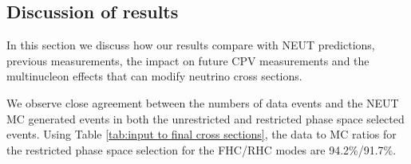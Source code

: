 


 
\subsection{Discussion of results}

In this section we discuss how our results compare with NEUT predictions, previous measurements,
the impact on future CPV measurements and the multinucleon effects that can modify neutrino
cross sections.

We observe close agreement between the numbers of data events
and the NEUT MC generated events in both the unrestricted and restricted
phase space selected events. Using Table \ref{tab:input to final cross sections},
the data to MC ratios for the restricted phase space selection
for the FHC/RHC modes are 94.2\%/91.7\%.


